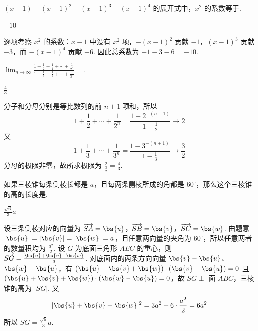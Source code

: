 \documentclass[UTF8,a4paper,oneside,11pt]{ctexbook}
\begin{document}
\begin{problem}
\((x-1)-(x-1)^2+(x-1)^3-(x-1)^4\) 的展开式中，\(x^2\) 的系数等于\fillinblank{}.
\end{problem}

\begin{answer}
\(-10\)
\end{answer}

\begin{solution}
逐项考察 \(x^2\) 的系数：\(x-1\) 中没有 \(x^2\) 项，\(-(x-1)^2\) 贡献 \(-1\)，\((x-1)^3\) 贡献 \(-3\)，而 \(-(x-1)^4\) 贡献 \(-6\). 因此总系数为 \(-1-3-6=-10\).
\end{solution}

\begin{problem}
\(\displaystyle\lim_{n\to\infty}\frac{1+\frac{1}{2}+\frac{1}{4}+\cdots+\frac{1}{2^n}}{1+\frac{1}{3}+\frac{1}{9}+\cdots+\frac{1}{3^n}}=\)\fillinblank{}.
\end{problem}

\begin{answer}
\(\frac{4}{3}\)
\end{answer}

\begin{solution}
分子和分母分别是等比数列的前 \(n+1\) 项和，所以
\[
1+\frac12+\cdots+\frac1{2^n}=\frac{1-2^{-(n+1)}}{1-\frac12}\longrightarrow2
\]
又
\[
1+\frac13+\cdots+\frac1{3^n}=\frac{1-3^{-(n+1)}}{1-\frac13}\longrightarrow\frac32
\]
分母的极限非零，故所求极限为 \(\frac{2}{\frac{3}{2}}=\frac43\).
\end{solution}

\begin{problem}
如果三棱锥每条侧棱长都是 \(a\)，且每两条侧棱所成的角都是 \(60^\circ\)，那么这个三棱锥的高的长度是\fillinblank{}.
\end{problem}

\begin{answer}
\(\frac{\sqrt{6}}{3}a\)
\end{answer}

\begin{solution}
设三条侧棱对应的向量为 \(\overrightarrow{SA}=\bs{u}\)，\(\overrightarrow{SB}=\bs{v}\)，\(\overrightarrow{SC}=\bs{w}\). 由题意 \(|\bs{u}|=|\bs{v}|=|\bs{w}|=a\)，且任意两向量的夹角为 \(60^\circ\)，所以任意两者的数量积均为 \(\frac{a^2}{2}\). 设 \(G\) 为底面三角形 \(ABC\) 的重心，则 \(\overrightarrow{SG}=\frac{\bs{u}+\bs{v}+\bs{w}}{3}\). 对底面内的两条方向向量 \(\bs{v}-\bs{u}\)、\(\bs{w}-\bs{u}\)，有 \((\bs{u}+\bs{v}+\bs{w})\cdot(\bs{v}-\bs{u})=0\) 且 \((\bs{u}+\bs{v}+\bs{w})\cdot(\bs{w}-\bs{u})=0\)，故 \(SG\perp\) 面 \(ABC\)，三棱锥的高为 \(|SG|\). 又
\[
|\bs{u}+\bs{v}+\bs{w}|^2=3a^2+6\cdot\frac{a^2}{2}=6a^2
\]
所以 \(SG=\frac{\sqrt6}{3}a\).
\end{solution}
\end{document}

